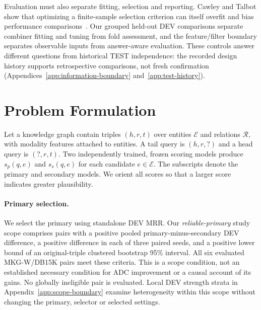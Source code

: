 \documentclass[11pt,a4paper]{article}
\begin{document}
Evaluation must also separate fitting, selection and reporting. Cawley and Talbot show that optimizing a finite-sample selection criterion can itself overfit and bias performance comparisons~\citep{cawley2010}. Our grouped held-out DEV comparisons separate combiner fitting and tuning from fold assessment, and the feature/filter boundary separates observable inputs from answer-aware evaluation. These controls answer different questions from historical TEST independence: the recorded design history supports retrospective comparisons, not fresh confirmation (Appendices~\ref{app:information-boundary} and~\ref{app:test-history}).

\section{Problem Formulation}
\label{sec:problem}

Let a knowledge graph contain triples $(h,r,t)$ over entities $\mathcal E$ and relations $\mathcal R$, with modality features attached to entities. A tail query is $(h,r,?)$ and a head query is $(?,r,t)$. Two independently trained, frozen scoring models produce $s_p(q,e)$ and $s_s(q,e)$ for each candidate $e\in\mathcal E$. The subscripts denote the primary and secondary models. We orient all scores so that a larger score indicates greater plausibility.

\paragraph{Primary selection.}
We select the primary using standalone DEV MRR. Our \emph{reliable-primary} study scope comprises pairs with a positive pooled primary-minus-secondary DEV difference, a positive difference in each of three paired seeds, and a positive lower bound of an original-triple clustered bootstrap 95\% interval. All six evaluated MKG-W/DB15K pairs meet these criteria. This is a scope condition, not an established necessary condition for ADC improvement or a causal account of its gains. No globally ineligible pair is evaluated. Local DEV strength strata in Appendix~\ref{app:scope-boundary} examine heterogeneity within this scope without changing the primary, selector or selected settings.
\end{document}
